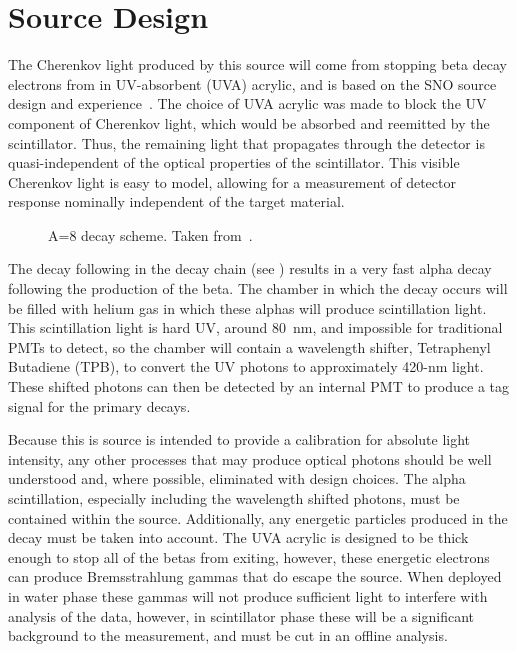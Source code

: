 \section{Source Design}
\label{chap:design}

The Cherenkov light produced by this source will come from stopping beta decay electrons from \Li in UV-absorbent (UVA) acrylic, and is based on the SNO \Li source design and experience~\cite{Tagg:2002,Tagg:2001}.
The choice of UVA acrylic was made to block the UV component of Cherenkov light, which would be absorbed and reemitted by the scintillator.
Thus, the remaining light that propagates through the {\snop} detector is quasi-independent of the optical properties of the {\labppo} scintillator. 
This visible Cherenkov light is easy to model, allowing for a measurement of detector response nominally independent of the target material.

\begin{figure}[]
\caption{\label{fig:decayscheme} A=8 decay scheme. Taken from~\cite{Tagg:2001}.}
\end{figure}

The decay following \Li in the decay chain (see ) results in a very fast alpha decay following the production of the beta.
The chamber in which the decay occurs will be filled with helium gas in which these alphas will produce scintillation light.
This scintillation light is hard UV, around 80~nm, and impossible for traditional PMTs to detect, so the chamber will contain a wavelength shifter, Tetraphenyl Butadiene (TPB), to convert the UV photons to approximately 420-nm light.
These shifted photons can then be detected by an internal PMT to produce a tag signal for the primary \Li decays.

Because this is source is intended to provide a calibration for absolute light intensity, any other processes that may produce optical photons should be well understood and, where possible, eliminated with design choices.
The alpha scintillation, especially including the wavelength shifted photons, must be contained within the source. 
Additionally, any energetic particles produced in the \Li decay must be taken into account.
The UVA acrylic is designed to be thick enough to stop all of the \Li betas from exiting, however, these energetic electrons can produce Bremsstrahlung gammas that do escape the source.
When deployed in water phase these gammas will not produce sufficient light to interfere with analysis of the data, however, in scintillator phase these will be a significant background to the measurement, and must be cut in an offline analysis. 

